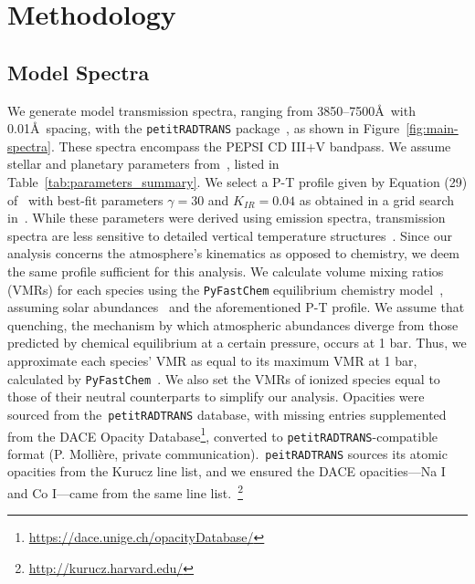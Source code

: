 \documentclass[twocolumn]{aastex631}
\newcommand{\code}[1]{\texttt{#1}}
\begin{document}
        
    \section{Methodology}\label{sec:Methodology}

        \subsection{Model Spectra}\label{subsec:Model Spectra}
            We generate model transmission spectra, ranging from 3850--7500\AA\ with 0.01\AA\ spacing, with the \code{petitRADTRANS} package~\citep{petitRADTRANS}, as shown in Figure~\ref{fig:main-spectra}. These spectra encompass the PEPSI CD III+V bandpass. We assume stellar and planetary parameters from~\citet{Lund2017}, listed in Table~\ref{tab:parameters_summary}. We select a P-T profile given by Equation (29) of~\citet{Guillot2010} with best-fit parameters $\gamma = 30$ and $K_{IR} = 0.04$ as obtained in a grid search in~\citet{Johnson2023}. While these parameters were derived using emission spectra, transmission spectra are less sensitive to detailed vertical temperature structures~\citep{Kesseli2020}. Since our analysis concerns the atmosphere's kinematics as opposed to chemistry, we deem the same profile sufficient for this analysis. 
            We calculate volume mixing ratios (VMRs) for each species using the \code{PyFastChem} equilibrium chemistry model~\citep{Stock2018, Stock2022, Kitzmann2023}, assuming solar abundances~\citep{Asplund2021} and the aforementioned P-T profile. We assume that quenching, the mechanism by which atmospheric abundances diverge from those predicted by chemical equilibrium at a certain pressure, occurs at 1 bar. Thus, we approximate each species' VMR as equal to its maximum VMR at 1 bar, calculated by \code{PyFastChem}~\citep{Johnson2023,Petz2023}. We also set the VMRs of ionized species equal to those of their neutral counterparts to simplify our analysis. Opacities were sourced from the~\code{petitRADTRANS} database, with missing entries supplemented from the DACE Opacity Database\footnote{\url{https://dace.unige.ch/opacityDatabase/}}, converted to \code{petitRADTRANS}-compatible format (P. Mollière, private communication).~\code{peitRADTRANS} sources its atomic opacities from the Kurucz line list, and we ensured the DACE opacities---Na I and Co I---came from the same line list.~\footnote{\url{http://kurucz.harvard.edu/}}
        
\end{document}
